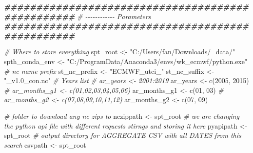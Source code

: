 \documentclass[
]{book}
\newenvironment{Shaded}{\begin{snugshade}}{\end{snugshade}}
\newcommand{\CommentTok}[1]{\textcolor[rgb]{0.56,0.35,0.01}{\textit{#1}}}
\newcommand{\DecValTok}[1]{\textcolor[rgb]{0.00,0.00,0.81}{#1}}
\newcommand{\DocumentationTok}[1]{\textcolor[rgb]{0.56,0.35,0.01}{\textbf{\textit{#1}}}}
\newcommand{\FunctionTok}[1]{\textcolor[rgb]{0.00,0.00,0.00}{#1}}
\newcommand{\NormalTok}[1]{#1}
\newcommand{\OtherTok}[1]{\textcolor[rgb]{0.56,0.35,0.01}{#1}}
\newcommand{\StringTok}[1]{\textcolor[rgb]{0.31,0.60,0.02}{#1}}
\begin{document}
\begin{Shaded}
\begin{Highlighting}[]
\DocumentationTok{\#\#\#\#\#\#\#\#\#\#\#\#\#\#\#\#\#\#\#\#\#\#\#\#\#\#\#\#\#\#\#\#\#\#\#\#\#\#\#\#\#\#\#\#\#\#\#\#\#}
\CommentTok{\# {-}{-}{-}{-}{-}{-}{-}{-}{-}{-}{-}{-} Parameters}
\DocumentationTok{\#\#\#\#\#\#\#\#\#\#\#\#\#\#\#\#\#\#\#\#\#\#\#\#\#\#\#\#\#\#\#\#\#\#\#\#\#\#\#\#\#\#\#\#\#\#\#\#\#}

\CommentTok{\# Where to store everything}
\NormalTok{spt\_root }\OtherTok{\textless{}{-}} \StringTok{"C:/Users/fan/Downloads/\_data/"}
\NormalTok{spth\_conda\_env }\OtherTok{\textless{}{-}} \StringTok{"C:/ProgramData/Anaconda3/envs/wk\_ecmwf/python.exe"}
\CommentTok{\# nc name prefix}
\NormalTok{st\_nc\_prefix }\OtherTok{\textless{}{-}} \StringTok{"ECMWF\_utci\_"}
\NormalTok{st\_nc\_suffix }\OtherTok{\textless{}{-}} \StringTok{"\_v1.0\_con.nc"}
\CommentTok{\# Years list}
\CommentTok{\# ar\_years \textless{}{-} 2001:2019}
\NormalTok{ar\_years }\OtherTok{\textless{}{-}} \FunctionTok{c}\NormalTok{(}\DecValTok{2005}\NormalTok{, }\DecValTok{2015}\NormalTok{)}
\CommentTok{\# ar\_months\_g1 \textless{}{-} c(\textquotesingle{}01\textquotesingle{},\textquotesingle{}02\textquotesingle{},\textquotesingle{}03\textquotesingle{},\textquotesingle{}04\textquotesingle{},\textquotesingle{}05\textquotesingle{},\textquotesingle{}06\textquotesingle{})}
\NormalTok{ar\_months\_g1 }\OtherTok{\textless{}{-}} \FunctionTok{c}\NormalTok{(}\StringTok{\textquotesingle{}01\textquotesingle{}}\NormalTok{, }\StringTok{\textquotesingle{}03\textquotesingle{}}\NormalTok{)}
\CommentTok{\# ar\_months\_g2 \textless{}{-} c(\textquotesingle{}07\textquotesingle{},\textquotesingle{}08\textquotesingle{},\textquotesingle{}09\textquotesingle{},\textquotesingle{}10\textquotesingle{},\textquotesingle{}11\textquotesingle{},\textquotesingle{}12\textquotesingle{})}
\NormalTok{ar\_months\_g2 }\OtherTok{\textless{}{-}} \FunctionTok{c}\NormalTok{(}\StringTok{\textquotesingle{}07\textquotesingle{}}\NormalTok{, }\StringTok{\textquotesingle{}09\textquotesingle{}}\NormalTok{)}


\CommentTok{\# folder to download any nc zips to}
\NormalTok{nczippath }\OtherTok{\textless{}{-}}\NormalTok{ spt\_root}
\CommentTok{\# we are changing the python api file with different requests stirngs and storing it here}
\NormalTok{pyapipath }\OtherTok{\textless{}{-}}\NormalTok{ spt\_root}
\CommentTok{\# output directory for AGGREGATE CSV with all DATES from this search}
\NormalTok{csvpath }\OtherTok{\textless{}{-}}\NormalTok{ spt\_root}


\end{Highlighting}
\end{Shaded}
\end{document}
